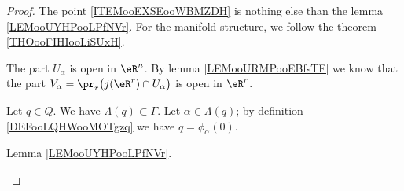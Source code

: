 \begin{proof}
	The point \ref{ITEMooEXSEooWBMZDH} is nothing else than the lemma \ref{LEMooUYHPooLPfNVr}. For the manifold structure, we follow the theorem \ref{THOooFIHIooLiSUxH}.
	\begin{subproof}
		The part  \(U_{\alpha} \) is open in \( \eR^n\). By lemma \ref{LEMooURMPooEBfsTF} we know that the part \( V_{\alpha}=\pr_r\big( j(\eR^r)\cap U_{\alpha} \big) \) is open in \( \eR^r\).

		\spitem[\( \bigcup_{\alpha\in\Gamma}\phi_{\alpha}(V_{\alpha})=Q\)]
		Let \( q\in Q\). We have \( \Lambda(q)\subset \Gamma\). Let \( \alpha\in \Lambda(q)\); by definition \eqref{DEFooLQHWooMOTgzq} we have \( q=\phi_{\alpha}(0)\).

		Lemma \ref{LEMooUYHPooLPfNVr}.


\end{subproof}
\end{proof}
